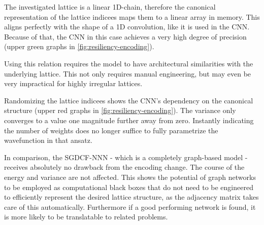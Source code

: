 The investigated lattice is a linear 1D-chain, therefore the canonical representation of the lattice indicees maps them to a linear array in memory. 
This aligns perfectly with the shape of a 1D convolution, like it is used in the CNN. 
Because of that, the CNN in this case achieves a very high degree of precision (upper green graphs in \autoref{fig:resiliency-encoding}).

Using this relation requires the model to have architectural similarities with the underlying lattice.
This not only requires manual engineering, but may even be very impractical for highly irregular lattices.

Randomizing the lattice indicees shows the CNN's dependency on the canonical structure (upper red graphs in \autoref{fig:resiliency-encoding}).
The variance only converges to a value one magnitude further away from zero.
Instantly indicating the number of weights does no longer suffice to fully parametrize the wavefunction in that ansatz.

In comparison, the SGDCF-NNN - which is a completely graph-based model - receives absolutely no drawback from the encoding change.
The course of the energy and variance are not affected. 
This shows the potential of graph networks to be employed as computational \glqq black boxes\grqq{} that do not need to be engineered to efficiently represent the desired lattice structure, as the adjacency matrix takes care of this automatically.
Furthermore if a good performing network is found, it is more likely to be translatable to related problems.
